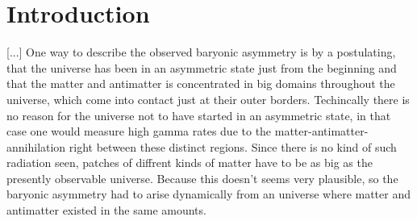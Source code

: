 \section{Introduction}
[...]
One way to describe the observed baryonic asymmetry is by a postulating, that the universe has been in an asymmetric state just from the beginning and that the matter and antimatter is concentrated in big domains throughout the universe, which come into contact just at their outer borders. Techincally there is no reason for the universe not to have started in an asymmetric state, in that case one would measure high gamma rates due to the matter-antimatter-annihilation right between these distinct regions. \newline
Since there is no kind of such radiation seen, patches of diffrent kinds of matter have to be as big as the presently observable universe. Because this doesn't seems very plausible, so the baryonic asymmetry had to arise dynamically from an universe where matter and antimatter existed in the same amounts. \newline
[...]
